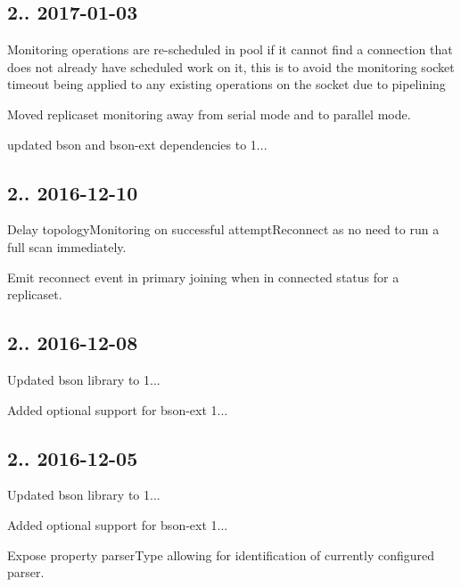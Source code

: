 \subsection*{2.. 2017-\/01-\/03 }


\begin{DoxyItemize}
\item Monitoring operations are re-\/scheduled in pool if it cannot find a connection that does not already have scheduled work on it, this is to avoid the monitoring socket timeout being applied to any existing operations on the socket due to pipelining
\item Moved replicaset monitoring away from serial mode and to parallel mode.
\item updated bson and bson-\/ext dependencies to 1...
\end{DoxyItemize}

\subsection*{2.. 2016-\/12-\/10 }


\begin{DoxyItemize}
\item Delay topology\+Monitoring on successful attempt\+Reconnect as no need to run a full scan immediately.
\item Emit reconnect event in primary joining when in connected status for a replicaset.
\end{DoxyItemize}

\subsection*{2.. 2016-\/12-\/08 }


\begin{DoxyItemize}
\item Updated bson library to 1...
\item Added optional support for bson-\/ext 1...
\end{DoxyItemize}

\subsection*{2.. 2016-\/12-\/05 }


\begin{DoxyItemize}
\item Updated bson library to 1...
\item Added optional support for bson-\/ext 1...
\item Expose property parser\+Type allowing for identification of currently configured parser.
\end{DoxyItemize}


